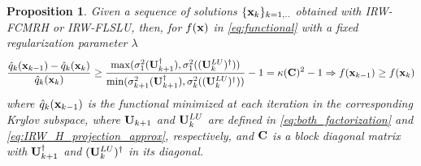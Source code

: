 \documentclass[11pt]{article}
\newtheorem{proposition}{Proposition}
\numberwithin{equation}{section}
\newcommand{\bfC}{{\bf C}}
\newcommand{\bfU}{{\bf U}}
\newcommand{\bfx}{{\bf x}}
\begin{document}
\begin{proposition}\label{prop3} Given a sequence of solutions $\{\bfx_k\}_{k=1,..	}$ obtained with IRW-FCMRH or IRW-FLSLU, then,
for $f(\bfx)$ in \eqref{eq:functional} with a fixed regularization parameter $\lambda$ %
\[\frac{\hat q_k(\bfx_{k-1})-\hat q_k(\bfx_{k})}{\hat q_k(\bfx_{k})} \geq \frac{\max(\sigma_1^2(\bfU_{k+1}^{\dagger}),\sigma_1^2((\bfU_{k}^{LU})^{\dagger}))}{\min(\sigma_{k+1}^2(\bfU_{k+1}^{\dagger}),\sigma_k^2((\bfU_{k}^{LU})^{\dagger}))}-1 = \kappa(\bfC)^2-1 \Rightarrow f(\bfx_{k-1}) \geq f(\bfx_k) \]
where $\hat q_k(\bfx_{k-1})$ is the functional minimized at each iteration in the corresponding Krylov subspace, where 
$\bfU_{k+1}$ and $\bfU^{LU}_{k}$ are defined in  \eqref{eq:both_factorization} and \eqref{eq:IRW_H_projection_approx}, respectively, and $\bfC$ is a block diagonal matrix with $\bfU_{k+1}^{\dagger}$ and $(\bfU^{LU}_{k})^{\dagger}$ in its diagonal. 
\end{proposition}
\end{document}
